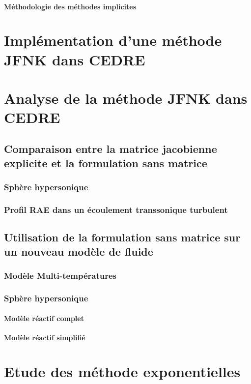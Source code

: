       \subsubsection{Méthodologie des méthodes implicites}




\chapter{Implémentation d'une méthode JFNK dans CEDRE}

\chapter{Analyse de la méthode JFNK dans CEDRE}
  \section{Comparaison entre la matrice jacobienne explicite et la formulation sans matrice}
    \subsection{Sphère hypersonique}
    \subsection{Profil RAE dans un écoulement transsonique turbulent}
  \section{Utilisation de la formulation sans matrice sur un nouveau modèle de fluide}
    \subsection{Modèle Multi-températures}
    \subsection{Sphère hypersonique}
      \subsubsection{Modèle réactif complet}
      \subsubsection{Modèle réactif simplifié}


\chapter{Etude des méthode exponentielles}
